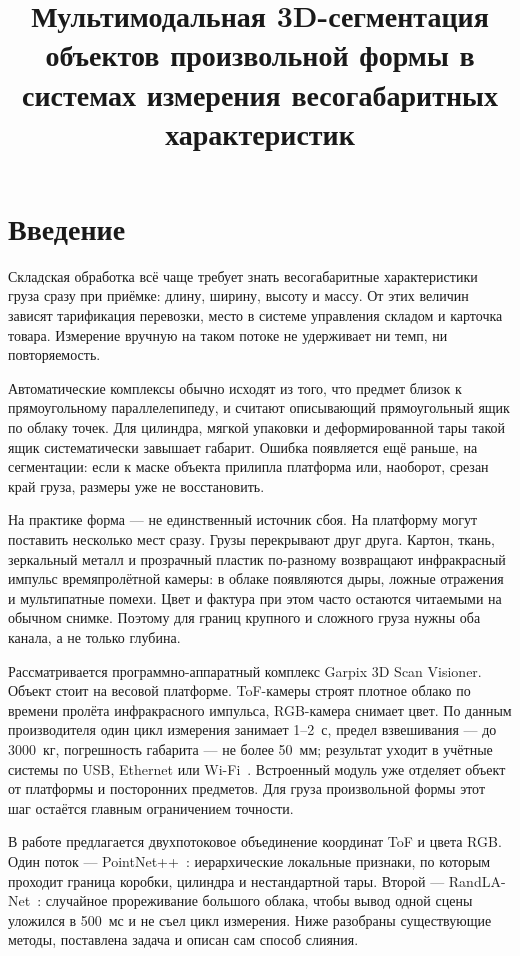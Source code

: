 \documentclass{misisarticle}
\title{Мультимодальная 3D-сегментация объектов произвольной формы в системах измерения весогабаритных характеристик}
\begin{document}
\maketitle

\section{Введение}

Складская обработка всё чаще требует знать весогабаритные характеристики груза сразу при приёмке: длину, ширину, высоту и массу. От этих величин зависят тарификация перевозки, место в системе управления складом и карточка товара. Измерение вручную на таком потоке не удерживает ни темп, ни повторяемость.

Автоматические комплексы обычно исходят из того, что предмет близок к прямоугольному параллелепипеду, и считают описывающий прямоугольный ящик по облаку точек. Для цилиндра, мягкой упаковки и деформированной тары такой ящик систематически завышает габарит. Ошибка появляется ещё раньше, на сегментации: если к маске объекта прилипла платформа или, наоборот, срезан край груза, размеры уже не восстановить.

На практике форма --- не единственный источник сбоя. На платформу могут поставить несколько мест сразу. Грузы перекрывают друг друга. Картон, ткань, зеркальный металл и прозрачный пластик по-разному возвращают инфракрасный импульс времяпролётной камеры: в облаке появляются дыры, ложные отражения и мультипатные помехи. Цвет и фактура при этом часто остаются читаемыми на обычном снимке. Поэтому для границ крупного и сложного груза нужны оба канала, а не только глубина.

Рассматривается программно-аппаратный комплекс Garpix 3D Scan Visioner. Объект стоит на весовой платформе. ToF-камеры строят плотное облако по времени пролёта инфракрасного импульса, RGB-камера снимает цвет. По данным производителя один цикл измерения занимает 1--2~с, предел взвешивания --- до 3000~кг, погрешность габарита --- не более 50~мм; результат уходит в учётные системы по USB, Ethernet или Wi-Fi~\cite{garpix}. Встроенный модуль уже отделяет объект от платформы и посторонних предметов. Для груза произвольной формы этот шаг остаётся главным ограничением точности.

В работе предлагается двухпотоковое объединение координат ToF и цвета RGB. Один поток --- PointNet++~\cite{pointnetpp}: иерархические локальные признаки, по которым проходит граница коробки, цилиндра и нестандартной тары. Второй --- RandLA-Net~\cite{randlanet}: случайное прореживание большого облака, чтобы вывод одной сцены уложился в 500~мс и не съел цикл измерения. Ниже разобраны существующие методы, поставлена задача и описан сам способ слияния.
\end{document}
